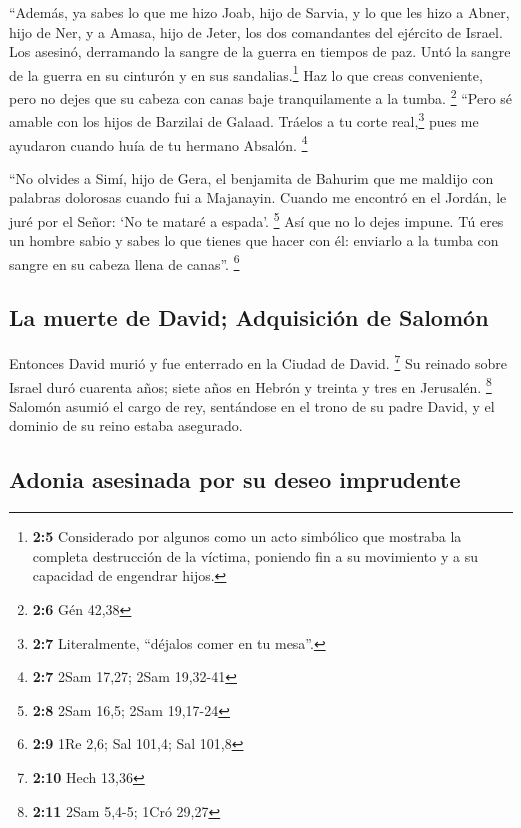  ``Además, ya sabes lo que me hizo Joab, hijo de Sarvia, y
lo que les hizo a Abner, hijo de Ner, y a Amasa, hijo de Jeter, los dos
comandantes del ejército de Israel. Los asesinó, derramando la sangre de
la guerra en tiempos de paz. Untó la sangre de la guerra en su cinturón
y en sus sandalias.\footnote{\textbf{2:5} Considerado por algunos como
  un acto simbólico que mostraba la completa destrucción de la víctima,
  poniendo fin a su movimiento y a su capacidad de engendrar hijos.}
 Haz lo que creas conveniente, pero no dejes que su cabeza
con canas baje tranquilamente a la tumba. \footnote{\textbf{2:6} Gén
  42,38}  ``Pero sé amable con los hijos de Barzilai de
Galaad. Tráelos a tu corte real,\footnote{\textbf{2:7} Literalmente,
  ``déjalos comer en tu mesa''.} pues me ayudaron cuando huía de tu
hermano Absalón. \footnote{\textbf{2:7} 2Sam 17,27; 2Sam 19,32-41}

 ``No olvides a Simí, hijo de Gera, el benjamita de
Bahurim que me maldijo con palabras dolorosas cuando fui a Majanayin.
Cuando me encontró en el Jordán, le juré por el Señor: `No te mataré a
espada'. \footnote{\textbf{2:8} 2Sam 16,5; 2Sam 19,17-24} 
Así que no lo dejes impune. Tú eres un hombre sabio y sabes lo que
tienes que hacer con él: enviarlo a la tumba con sangre en su cabeza
llena de canas''. \footnote{\textbf{2:9} 1Re 2,6; Sal 101,4; Sal 101,8}

\hypertarget{la-muerte-de-david-adquisiciuxf3n-de-salomuxf3n}{%
\subsection{La muerte de David; Adquisición de
Salomón}\label{la-muerte-de-david-adquisiciuxf3n-de-salomuxf3n}}

 Entonces David murió y fue enterrado en la Ciudad de
David. \footnote{\textbf{2:10} Hech 13,36}  Su reinado
sobre Israel duró cuarenta años; siete años en Hebrón y treinta y tres
en Jerusalén. \footnote{\textbf{2:11} 2Sam 5,4-5; 1Cró 29,27}
 Salomón asumió el cargo de rey, sentándose en el trono
de su padre David, y el dominio de su reino estaba asegurado.

\hypertarget{adonia-asesinada-por-su-deseo-imprudente}{%
\subsection{Adonia asesinada por su deseo
imprudente}\label{adonia-asesinada-por-su-deseo-imprudente}}

